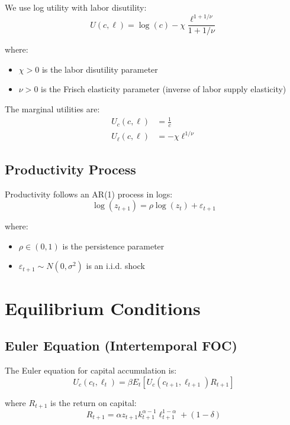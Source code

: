 \documentclass[11pt]{article}
\theoremstyle{definition}
\begin{document}
We use log utility with labor disutility:
\begin{equation}
U(c, \ell) = \log(c) - \chi \frac{\ell^{1+1/\nu}}{1+1/\nu}
\end{equation}

where:
\begin{itemize}[leftmargin=*, itemsep=0.1em]
\item $\chi > 0$ is the labor disutility parameter
\item $\nu > 0$ is the Frisch elasticity parameter (inverse of labor supply elasticity)
\end{itemize}

The marginal utilities are:
\begin{align}
U_c(c, \ell) &= \frac{1}{c} \\
U_{\ell}(c, \ell) &= -\chi \ell^{1/\nu}
\end{align}

\subsection{Productivity Process}

Productivity follows an AR(1) process in logs:
\begin{equation}
\log(z_{t+1}) = \rho \log(z_t) + \varepsilon_{t+1}
\end{equation}

where:
\begin{itemize}[leftmargin=*, itemsep=0.1em]
\item $\rho \in (0,1)$ is the persistence parameter
\item $\varepsilon_{t+1} \sim N(0, \sigma^2)$ is an i.i.d. shock
\end{itemize}

\section{Equilibrium Conditions}

\subsection{Euler Equation (Intertemporal FOC)}

The Euler equation for capital accumulation is:
\begin{equation}
U_c(c_t, \ell_t) = \beta E_t \left[ U_c(c_{t+1}, \ell_{t+1}) R_{t+1} \right]
\end{equation}

where $R_{t+1}$ is the return on capital:
\begin{equation}
R_{t+1} = \alpha z_{t+1} k_{t+1}^{\alpha-1} \ell_{t+1}^{1-\alpha} + (1-\delta)
\end{equation}
\end{document}
